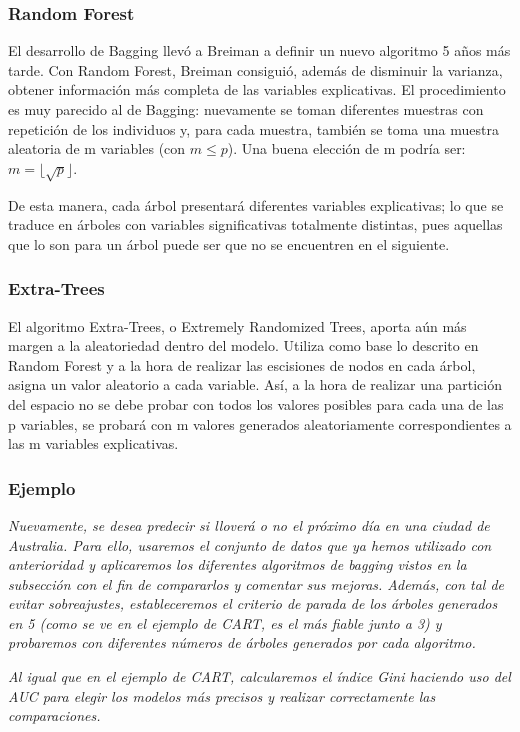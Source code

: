 \documentclass[12pt,twoside]{article}
\begin{document}
\subsubsection{Random Forest}
El desarrollo de Bagging llevó a Breiman a definir un nuevo algoritmo 5 años más tarde. Con Random Forest, Breiman consiguió, además de disminuir la varianza, obtener información más completa de las variables explicativas. El procedimiento es muy parecido al de Bagging: nuevamente se toman diferentes muestras con repetición de los individuos y, para cada muestra, también se toma una muestra aleatoria de m variables (con $m \leq p$). Una buena elección de m podría ser: $ m = \lfloor \sqrt{p} \rfloor$.

De esta manera, cada árbol presentará diferentes variables explicativas; lo que se traduce en árboles con variables significativas totalmente distintas, pues aquellas que lo son para un árbol puede ser que no se encuentren en el siguiente.


\subsubsection{Extra-Trees}
El algoritmo Extra-Trees, o Extremely Randomized Trees, aporta aún más margen a la aleatoriedad dentro del modelo. Utiliza como base lo descrito en Random Forest y a la hora de realizar las escisiones de nodos en cada árbol, asigna un valor aleatorio a cada variable. Así, a la hora de realizar una partición del espacio no se debe probar con todos los valores posibles para cada una de las p variables, se probará con m valores generados aleatoriamente correspondientes a las m variables explicativas.


\subsubsection{Ejemplo}
\textit{Nuevamente, se desea predecir si lloverá o no el próximo día en una ciudad de Australia. Para ello, usaremos el conjunto de datos que ya hemos utilizado con anterioridad y aplicaremos los diferentes algoritmos de bagging vistos en la subsección con el fin de compararlos y comentar sus mejoras. Además, con tal de evitar sobreajustes, estableceremos el criterio de parada de los árboles generados en 5 (como se ve en el ejemplo de CART, es el más fiable junto a 3) y probaremos con diferentes números de árboles generados por cada algoritmo.}

\textit{Al igual que en el ejemplo de CART, calcularemos el índice Gini haciendo uso del AUC para elegir los modelos más precisos y realizar correctamente las comparaciones.}
\end{document}
